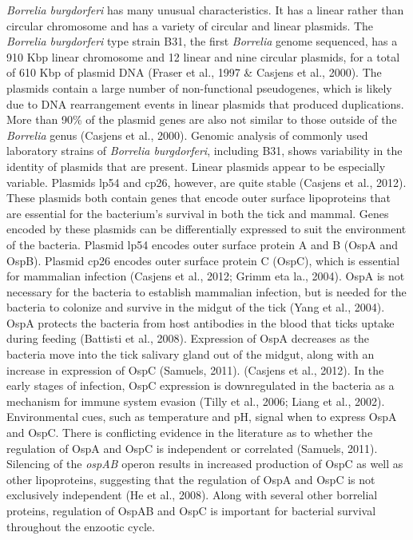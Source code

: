\documentclass[12pt,twoside]{reedthesis}
\begin{document}
	
	
	
	 \textit{Borrelia burgdorferi} has many unusual characteristics. It has a linear rather than circular chromosome and has a variety of circular and linear plasmids. The \textit{Borrelia burgdorferi} type strain B31, the first \textit{Borrelia} genome sequenced, has a 910 Kbp linear chromosome and 12 linear and nine circular plasmids, for a total of 610 Kbp of plasmid DNA (Fraser et al., 1997 \& Casjens et al., 2000). The plasmids contain a large number of non-functional pseudogenes, which is likely due to DNA rearrangement events in linear plasmids that produced duplications. More than 90\% of the plasmid genes are also not similar to those outside of the \textit{Borrelia} genus (Casjens et al., 2000). Genomic analysis of commonly used laboratory strains of \textit{Borrelia  burgdorferi}, including B31, shows variability in the identity of plasmids that are present. Linear plasmids appear to be especially variable. Plasmids lp54 and cp26, however, are quite stable (Casjens et al., 2012). These plasmids both contain genes that encode outer surface lipoproteins that are essential for the bacterium's survival in both the tick and mammal. Genes encoded by these plasmids can be differentially expressed to suit the environment of the bacteria. Plasmid lp54 encodes outer surface protein A and B (OspA and OspB). Plasmid cp26 encodes outer surface protein C (OspC), which is essential for mammalian infection (Casjens et al., 2012; Grimm eta la., 2004). OspA is not necessary for the bacteria to establish mammalian infection, but is needed for the bacteria to colonize and survive in the midgut of the tick (Yang et al., 2004). OspA protects the bacteria from host antibodies in the blood that ticks uptake during feeding (Battisti et al., 2008). Expression of OspA decreases as the bacteria move into the tick salivary gland out of the midgut, along with an increase in expression of OspC (Samuels, 2011).    (Casjens et al., 2012). In the early stages of infection, OspC expression is downregulated in the bacteria as a mechanism for immune system evasion (Tilly et al., 2006; Liang et al., 2002). Environmental cues, such as temperature and pH, signal when to express OspA and OspC. There is conflicting evidence in the literature as to whether the regulation of OspA and OspC is independent or correlated (Samuels, 2011). Silencing of the \textit{ospAB} operon results in increased production of OspC as well as other lipoproteins, suggesting that the regulation of OspA and OspC is not exclusively independent (He et al., 2008). Along with several other borrelial proteins,  regulation of OspAB and OspC is important for bacterial survival throughout the enzootic cycle. 
	 
\end{document}
